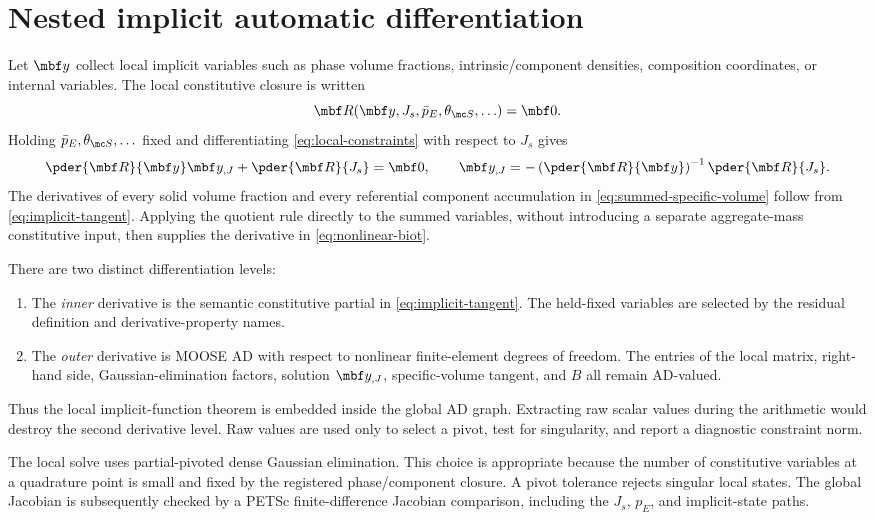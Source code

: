 \section{Nested implicit automatic differentiation}

Let \(\mbf y\) collect local implicit variables such as phase volume fractions,
intrinsic/component densities, composition coordinates, or internal variables.
The local constitutive closure is written
\begin{equation}
 \mbf R(\mbf y,J_s,\bar p_E,\theta_{\mc S},\ldots)=\mbf 0.
 \label{eq:local-constraints}
\end{equation}
Holding \(\bar p_E,\theta_{\mc S},\ldots\) fixed and differentiating
\cref{eq:local-constraints} with respect to \(J_s\) gives
\begin{equation}
 \pder{\mbf R}{\mbf y}\mbf y_{,J}
 +\pder{\mbf R}{J_s}=\mbf 0,
 \qquad
 \mbf y_{,J}=-
 \left(\pder{\mbf R}{\mbf y}\right)^{-1}
 \pder{\mbf R}{J_s}.
 \label{eq:implicit-tangent}
\end{equation}
The derivatives of every solid volume fraction and every referential component
accumulation in \cref{eq:summed-specific-volume} follow from
\cref{eq:implicit-tangent}.  Applying the quotient rule directly to the summed
variables, without introducing a separate aggregate-mass constitutive input,
then supplies the derivative in \cref{eq:nonlinear-biot}.

There are two distinct differentiation levels:
\begin{enumerate}
 \item The \emph{inner} derivative is the semantic constitutive partial in
       \cref{eq:implicit-tangent}.  The held-fixed variables are selected by the
       residual definition and derivative-property names.
 \item The \emph{outer} derivative is MOOSE AD with respect to nonlinear
       finite-element degrees of freedom.  The entries of the local matrix,
       right-hand side, Gaussian-elimination factors, solution \(\mbf y_{,J}\),
       specific-volume tangent, and \(B\) all remain AD-valued.
\end{enumerate}
Thus the local implicit-function theorem is embedded inside the global AD
graph.  Extracting raw scalar values during the arithmetic would destroy the
second derivative level.  Raw values are used only to select a pivot, test for
singularity, and report a diagnostic constraint norm.

The local solve uses partial-pivoted dense Gaussian elimination.  This choice is
appropriate because the number of constitutive variables at a quadrature point
is small and fixed by the registered phase/component closure.  A pivot tolerance
rejects singular local states.  The global Jacobian is subsequently checked by
a PETSc finite-difference Jacobian comparison, including the \(J_s\), \(p_E\),
and implicit-state paths.
